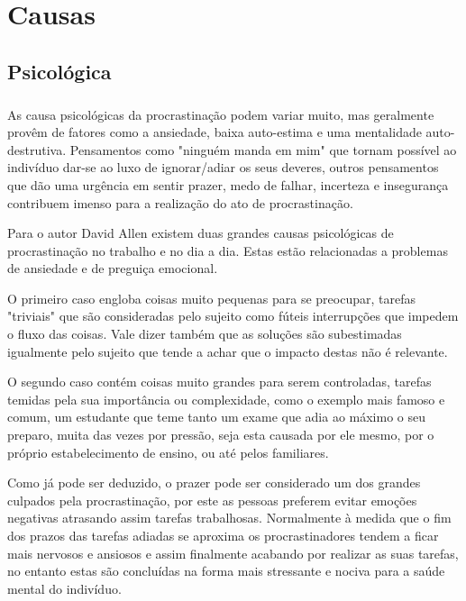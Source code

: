 \documentclass{report}
\begin{document}


\chapter{Causas}
\label{chap.causas}


\section{Psicológica}
\label{chap.psicológica}
\paragraph{}
As causa psicológicas da procrastinação podem variar muito, mas geralmente provêm de fatores como a ansiedade, baixa auto-estima e uma mentalidade auto-destrutiva. Pensamentos como "ninguém manda em mim" que tornam possível ao indivíduo dar-se ao luxo de ignorar/adiar os seus deveres, outros pensamentos que dão uma urgência em sentir prazer, medo de falhar, incerteza e insegurança contribuem imenso para a realização do ato de procrastinação.

Para o autor David Allen existem duas grandes causas psicológicas de procrastinação no trabalho e no dia a dia. Estas estão relacionadas a problemas de ansiedade e de preguiça emocional. 

O primeiro caso engloba coisas muito pequenas para se preocupar, tarefas "triviais" que são consideradas pelo sujeito como fúteis interrupções que impedem o fluxo das coisas. Vale dizer também que as soluções são subestimadas igualmente pelo sujeito que tende a achar que o impacto destas não é relevante.

O segundo caso contém coisas muito grandes para serem controladas, tarefas temidas pela sua importância ou complexidade, como o exemplo mais famoso e comum, um estudante que teme tanto um exame que adia ao máximo o seu preparo, muita das vezes por pressão, seja esta causada por ele mesmo, por o próprio estabelecimento de ensino, ou até pelos familiares.

\vspace{3mm}


Como já pode ser deduzido, o prazer pode ser considerado um dos grandes culpados pela procrastinação, por este as pessoas preferem evitar emoções negativas atrasando assim tarefas trabalhosas. Normalmente à medida que o fim dos prazos das tarefas adiadas se aproxima os procrastinadores tendem a ficar mais nervosos e ansiosos e assim finalmente acabando por realizar as suas tarefas, no entanto estas são concluídas na forma mais stressante e nociva para a saúde mental do indivíduo.
\end{document}
